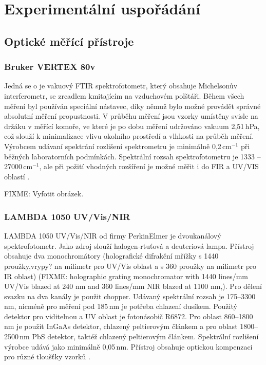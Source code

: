 \chapter{Experimentální uspořádání}

\section{Optické měřící přístroje}

\subsection{Bruker VERTEX 80v}
Jedná se o je vakuový FTIR spektrofotometr, který obsahuje Michelsonův interferometr, se zrcadlem kmitajícím na vzduchovém polštáři. Během všech měření byl používán speciální nástavec, díky němuž bylo možné provádět správné absolutní měření propustnosti. V průběhu měření jsou vzorky umístěny svisle na držáku v měřící komoře, ve které je po dobu měření udržováno vakuum 2,51\,hPa, což slouží k minimalizace vlivu okolního prostředí a vlhkosti na průběh měření. Výrobcem udávaní spektrání rozlišení spektrometru je minimálně 0,2\,cm$^{-1}$ při běžných laboratorních podmínkách. Spektrální rozsah spektrofotometru je 1333 -- 27000\,cm$^{-1}$, ale při požití vhodných rozšíření je možné měřit i do FIR a UV/VIS oblastí \cite{vertex}.

FIXME: Vyfotit obrázek.


\subsection{LAMBDA 1050 UV/Vis/NIR}
LAMBDA 1050 UV/Vis/NIR od firmy PerkinElmer je dvoukanálový spektrofotometr. Jako zdroj slouží halogen-rtuťová a deuteriová lampa.  Přístroj obsahuje dva monochromátory (holografické difrakční mřížky s 1440 proužky,vrypy? na milimetr pro UV/Vis oblast a s 360 proužky na milimetr pro IR oblast)  (FIXME: holographic grating monochromator with 1440 lines/mm UV/Vis blazed at 240 nm and 360 lines/mm NIR blazed at 1100 nm,). Pro dělení svazku na dva kanály je použit chopper. Udávaný spektrální rozsah je 175--3300\,nm, nicméně pro měření pod 185\,nm je potřeba chlazení dusíkem. Použitý detektor pro viditelnou a UV oblast je fotonásobič R6872. Pro oblast 860--1800\,nm je použit InGaAs detektor, chlazený peltierovým článkem a pro oblast 1800--2500\,nm PbS detektor, taktéž chlazený peltierovým článkem. Spektrální rozlišení výrobce udává jako minimálně 0,05\,nm. Přístroj obsahuje optickou kompenzaci pro různé tloušťky vzorků \cite{lambda}.

